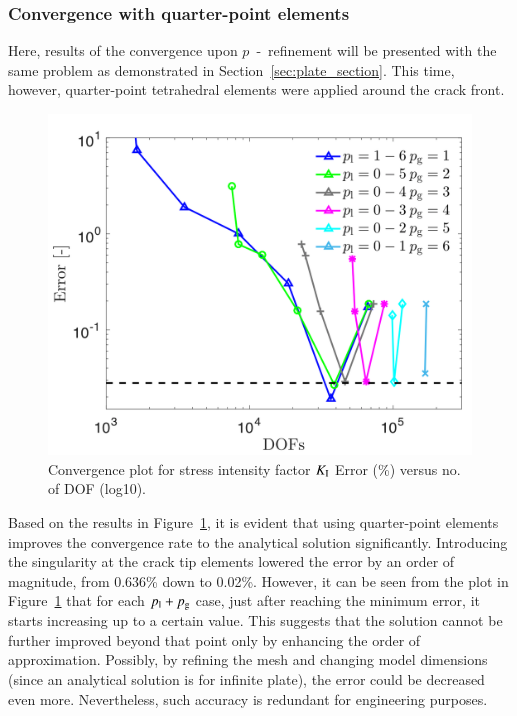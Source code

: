 \documentclass[11pt]{acmeArticle}
\numberwithin{equation}{section}
\begin{document}
\subsubsection{Convergence with quarter-point elements}
Here, results of the convergence upon $p$~-~refinement will be presented with the same problem as demonstrated in Section~\ref{sec:plate_section}. 
This time, however, quarter-point tetrahedral elements were applied around the crack front.
\begin{figure}[h!]
	\centering
	\includegraphics[width=0.7\linewidth]{Figures/graphs/plate_conv_singularity.png}
	\caption{Convergence plot for stress intensity factor $K_{\rm I}$ Error (\%) versus no. of DOF (log10).}
	\label{fig:plate_conv_singularity}
\end{figure}
Based on the results in Figure~\ref{fig:plate_conv_singularity}, it is evident that using quarter-point elements improves the convergence rate to the analytical solution significantly. 
Introducing the singularity at the crack tip elements lowered the error by an order of magnitude, from 0.636\% down to 0.02\%. 
However, it can be seen from the plot in Figure~\ref{fig:plate_conv_singularity} that for each $p_{\rm l} + p_{\rm g}$ case, just after reaching the minimum error, it starts increasing up to a certain value. 
This suggests that the solution cannot be further improved beyond that point only by enhancing the order of approximation. 
Possibly, by refining the mesh and changing model dimensions (since an analytical solution is for infinite plate), the error could be decreased even more. 
Nevertheless, such accuracy is redundant for engineering purposes. \\
\end{document}
